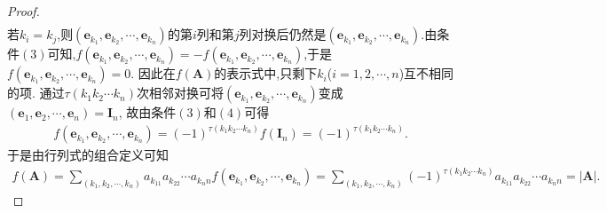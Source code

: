 \documentclass[../../main.tex]{subfiles}
\begin{document}
\begin{proof}
\begin{align*}
\end{align*}
若\(k_i = k_j\),则\((\boldsymbol{e}_{k_1},\boldsymbol{e}_{k_2},\cdots,\boldsymbol{e}_{k_n})\)的第\(i\)列和第\(j\)列对换后仍然是\((\boldsymbol{e}_{k_1},\boldsymbol{e}_{k_2},\cdots,\boldsymbol{e}_{k_n})\).由条件\((3)\)可知,\(f(\boldsymbol{e}_{k_1},\boldsymbol{e}_{k_2},\cdots,\boldsymbol{e}_{k_n}) = -f(\boldsymbol{e}_{k_1},\boldsymbol{e}_{k_2},\cdots,\boldsymbol{e}_{k_n})\),于是\(f(\boldsymbol{e}_{k_1},\boldsymbol{e}_{k_2},\cdots,\boldsymbol{e}_{k_n}) = 0\).
因此在\(f(\boldsymbol{A})\)的表示式中,只剩下\(k_i\)(\(i = 1,2,\cdots,n\))互不相同的项.
通过\(\tau(k_1k_2\cdots k_n)\)次相邻对换可将\((\boldsymbol{e}_{k_1},\boldsymbol{e}_{k_2},\cdots,\boldsymbol{e}_{k_n})\)变成\((\boldsymbol{e}_1,\boldsymbol{e}_2,\cdots,\boldsymbol{e}_n) = \boldsymbol{I}_n\),
故由条件\((3)\)和\((4)\)可得
\begin{align*}
f(\boldsymbol{e}_{k_1},\boldsymbol{e}_{k_2},\cdots,\boldsymbol{e}_{k_n}) = (-1)^{\tau(k_1k_2\cdots k_n)}f(\boldsymbol{I}_n) = (-1)^{\tau(k_1k_2\cdots k_n)}.
\end{align*}
于是由行列式的组合定义可知
\begin{align*}
f(\boldsymbol{A}) = \sum_{(k_1,k_2,\cdots,k_n)}a_{k_11}a_{k_22}\cdots a_{k_nn}f(\boldsymbol{e}_{k_1},\boldsymbol{e}_{k_2},\cdots,\boldsymbol{e}_{k_n}) = \sum_{(k_1,k_2,\cdots,k_n)}(-1)^{\tau(k_1k_2\cdots k_n)}a_{k_11}a_{k_22}\cdots a_{k_nn} = |\boldsymbol{A}|.
\end{align*}

\end{proof}
\end{document}
